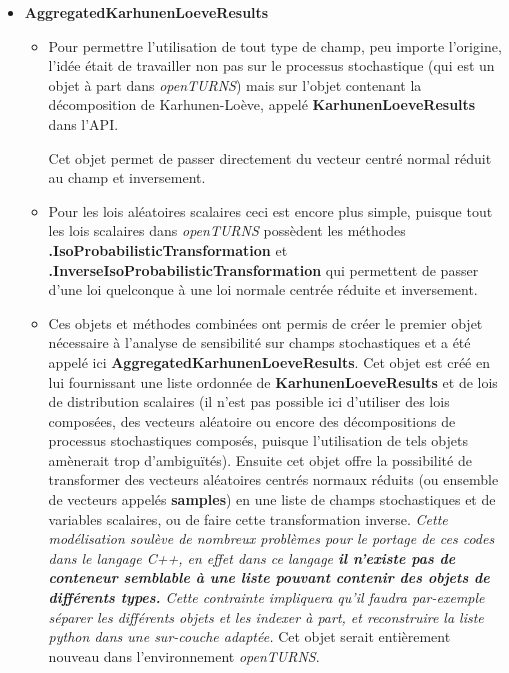 \documentclass[a4paper,10pt]{article}
\begin{document}
\begin{itemize}

  \item \textbf{AggregatedKarhunenLoeveResults} 
  \begin{itemize}
    \item Pour permettre l'utilisation de tout type de champ, peu importe l'origine, l'idée était de travailler non pas sur le processus stochastique (qui est un objet à part dans \textit{openTURNS}) mais sur l'objet contenant la décomposition de Karhunen-Loève, appelé \textbf{KarhunenLoeveResults} dans l'API. 
  
  Cet objet permet de passer directement du vecteur centré normal réduit au champ et inversement. 
    \item Pour les lois aléatoires scalaires ceci est encore plus simple, puisque tout les lois scalaires dans \textit{openTURNS} possèdent les méthodes \textbf{.IsoProbabilisticTransformation} et \textbf{.InverseIsoProbabilisticTransformation} qui permettent de passer d'une loi quelconque à une loi normale centrée réduite et inversement.
  
    \item Ces objets et méthodes combinées ont permis de créer le premier objet nécessaire à l'analyse de sensibilité sur champs stochastiques et a été appelé ici \textbf{AggregatedKarhunenLoeveResults}. Cet objet est créé en lui fournissant une liste ordonnée de \textbf{KarhunenLoeveResults} et de lois de distribution scalaires (il n'est pas possible ici d'utiliser des lois composées, des vecteurs aléatoire ou encore des décompositions de processus stochastiques composés, puisque l'utilisation de tels objets amènerait trop d’ambiguïtés). Ensuite cet objet offre la possibilité de transformer des vecteurs aléatoires centrés normaux réduits (ou ensemble de vecteurs appelés \textbf{samples}) en une liste de champs stochastiques et de variables scalaires, ou de faire cette transformation inverse. \emph{Cette modélisation soulève de nombreux problèmes pour le portage de ces codes dans le langage C++, en effet dans ce langage \textbf{il n'existe pas de conteneur semblable à une liste pouvant contenir des objets de différents types.} Cette contrainte impliquera qu'il faudra par-exemple séparer les différents objets et les indexer à part, et reconstruire la liste python dans une sur-couche adaptée.} 
  Cet objet serait entièrement nouveau dans l'environnement \textit{openTURNS}.
  \end{itemize}
  

\end{itemize}
\end{document}
